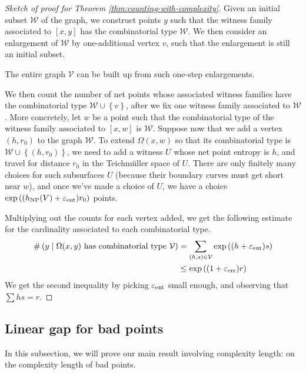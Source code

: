 \documentclass[12pt, reqno]{amsart}
\begin{document}
\begin{proof}[Sketch of proof for Theorem \ref{thm:counting-with-complexity}]
  Given an initial subset $\mathcal{W}$ of the graph, we construct points $y$ such that the witness family associated to $[x,y]$ has the combinatorial type $\mathcal{W}$.
  We then consider an enlargement of $\mathcal{W}$ by one-additional vertex $v$, such that the enlargement is still an initial subset.
  \begin{claim*}
    The entire graph $\mathcal{V}$ can be built up from such one-step enlargements.
  \end{claim*}

  We then count the number of net points whose associated witness families have the combinatorial type $\mathcal{W} \cup \left\{ v \right\}$, after we fix one witness family associated to $\mathcal{W}$.
  More concretely, let $w$ be a point such that the combinatorial type of the witness family associated to $[x,w]$ is $\mathcal{W}$.
  Suppose now that we add a vertex $(h, r_0)$ to the graph $\mathcal{W}$.
  To extend $\Omega(x,w)$ so that its combinatorial type is $\mathcal{W} \cup \left\{ (h, r_0) \right\}$, we need to add a witness $U$ whose net point entropy is $h$, and travel for distance $r_0$ in the Teichmüller space of $U$.
  There are only finitely many choices for such subsurfaces $U$ (because their boundary curves must get short near $w$), and once we've made a choice of $U$, we have a choice $\exp\left( (h_{\mathrm{NP}}(V) + \varepsilon_{\mathrm{ent}}) r_0 \right)$ points.

  Multiplying out the counts for each vertex added, we get the following estimate for the cardinality associated to each combinatorial type.
  \begin{align*}
    \#\left( y \mid \text{$\Omega(x,y)$ has combinatorial type $\mathcal{V}$} \right) &= \sum_{(h, s) \in \mathcal{V}} \exp\left( (h + \varepsilon_{\mathrm{ent}})s \right) \\
    &\leq \exp\left( (1 + \varepsilon_{\mathrm{err}})r \right)
  \end{align*}
  We get the second inequality by picking $\varepsilon_{\mathrm{ent}}$ small enough, and observing that $\sum hs = r$.
\end{proof}

\subsection{Linear gap for bad points}
\label{sec:linear-gap-bad}

In this subsection, we will prove our main result involving complexity length: on the complexity length of bad points.
\end{document}
